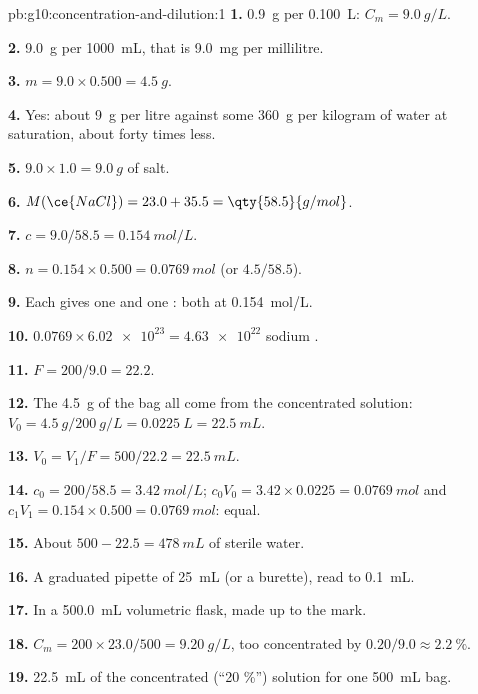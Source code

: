 \begin{solution}{pb:g10:concentration-and-dilution:1}
\textbf{1.} \qty{0.9}{g} per \qty{0.100}{L}: $C_m = \qty{9.0}{g/L}$.

\textbf{2.} \qty{9.0}{g} per \qty{1000}{mL}, that is \qty{9.0}{mg} per
millilitre.

\textbf{3.} $m = 9.0 \times 0.500 = \qty{4.5}{g}$.

\textbf{4.} Yes: about \qty{9}{g} per litre against some \qty{360}{g} per
kilogram of water at saturation, about forty times less.

\textbf{5.} $9.0 \times 1.0 = \qty{9.0}{g}$ of salt.

\textbf{6.} $M(\ce{NaCl}) = 23.0 + 35.5 = \qty{58.5}{g/mol}$.

\textbf{7.} $c = 9.0 / 58.5 = \qty{0.154}{mol/L}$.

\textbf{8.} $n = 0.154 \times 0.500 = \qty{0.0769}{mol}$ (or
$4.5 / 58.5$).

\textbf{9.} Each  gives one  and one : both at
\qty{0.154}{mol/L}.

\textbf{10.} $0.0769 \times \num{6.02e23} = \num{4.63e22}$ sodium .

\textbf{11.} $F = 200 / 9.0 = 22.2$.

\textbf{12.} The \qty{4.5}{g} of the bag all come from the concentrated
solution: $V_0 = \qty{4.5}{g} / \qty{200}{g/L} = \qty{0.0225}{L} =
\qty{22.5}{mL}$.

\textbf{13.} $V_0 = V_1 / F = 500 / 22.2 = \qty{22.5}{mL}$.

\textbf{14.} $c_0 = 200 / 58.5 = \qty{3.42}{mol/L}$;
$c_0 V_0 = 3.42 \times 0.0225 = \qty{0.0769}{mol}$ and
$c_1 V_1 = 0.154 \times 0.500 = \qty{0.0769}{mol}$: equal.

\textbf{15.} About $500 - 22.5 = \qty{478}{mL}$ of sterile water.

\textbf{16.} A graduated pipette of \qty{25}{mL} (or a burette), read to
\qty{0.1}{mL}.

\textbf{17.} In a \qty{500.0}{mL} volumetric flask, made up to the mark.

\textbf{18.} $C_m = 200 \times 23.0 / 500 = \qty{9.20}{g/L}$, too
concentrated by $0.20 / 9.0 \approx \qty{2.2}{\percent}$.

\textbf{19.} \qty{22.5}{mL} of the concentrated (``20 \%'') solution for
one \qty{500}{mL} bag.
\end{solution}
